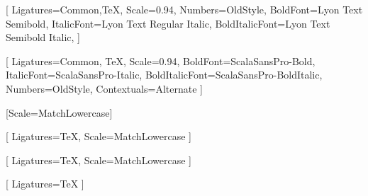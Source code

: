 %



\setmainfont{Lyon Text Regular}[
    Ligatures={Common,TeX},
    Scale=0.94, %
    Numbers={OldStyle},
    BoldFont=Lyon Text Semibold,
    ItalicFont=Lyon Text Regular Italic,
    BoldItalicFont=Lyon Text Semibold Italic,
]

\setsansfont{ScalaSansPro-Regular}[
    Ligatures={Common, TeX},
    Scale=0.94,
    BoldFont=ScalaSansPro-Bold,
    ItalicFont=ScalaSansPro-Italic,
    BoldItalicFont=ScalaSansPro-BoldItalic,
    Numbers={OldStyle},
    Contextuals={Alternate}
]

\setmonofont{Iosevka}[Scale=MatchLowercase]

[
    Ligatures=TeX,
    Scale=MatchLowercase
]

\setmathfontface{}[
    Ligatures=TeX,
    Scale=MatchLowercase
]

\setoperatorfont\mathoper

\newfontface{}[
    Ligatures=TeX
]

